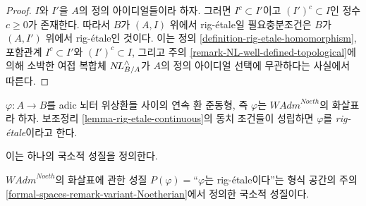 \begin{proof}
$I$와 $I'$을 $A$의 정의 아이디얼들이라 하자.
그러면 $I^c \subset I'$이고 $(I')^c \subset I$인 정수 $c \geq 0$가 존재한다.
따라서 $B$가 $(A, I)$ 위에서 rig-\'etale일 필요충분조건은
$B$가 $(A, I')$ 위에서 rig-\'etale인 것이다. 이는 정의
\ref{definition-rig-etale-homomorphism}, 포함관계
$I^c \subset I'$와 $(I')^c \subset I$, 그리고 주의
\ref{remark-NL-well-defined-topological}에 의해 소박한 여접 복합체
$\mathop{N\!L}\nolimits_{B/A}^\wedge$가 $A$의 정의 아이디얼 선택에 무관하다는 사실에서 따른다.
\end{proof}

\begin{definition}
\label{definition-rig-etale-continuous-homomorphism}
$\varphi : A \to B$를 adic 뇌터 위상환들 사이의 연속 환 준동형,
즉 $\varphi$는 $\textit{WAdm}^{Noeth}$의 화살표라 하자. 보조정리
\ref{lemma-rig-etale-continuous}의 동치 조건들이 성립하면
$\varphi$를 {\it rig-\'etale}이라고 한다.
\end{definition}

\noindent
이는 하나의 국소적 성질을 정의한다.

\begin{lemma}
\label{lemma-rig-etale-axioms}
$\textit{WAdm}^{Noeth}$의 화살표에 관한 성질
$P(\varphi)=$``$\varphi$는 rig-\'etale이다''는 형식 공간의 주의
\ref{formal-spaces-remark-variant-Noetherian}에서 정의한 국소적 성질이다.
\end{lemma}

